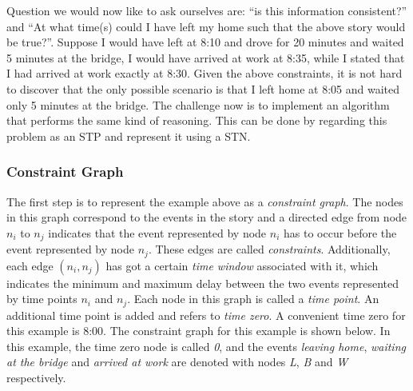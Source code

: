 \documentclass{article}
\theoremstyle{definition}
\begin{document}
Question we would now like to ask ourselves are: ``is this information consistent?'' and ``At what time(s) could I have left my home such that the above story would be true?''. 
Suppose I would have left at 8:10 and drove for 20 minutes and waited 5 minutes at the bridge, I would have arrived at work at 8:35, while I stated that I had arrived at work exactly at 8:30. 
Given the above constraints, it is not hard to discover that the only possible scenario is that I left home at 8:05 and waited only 5 minutes at the bridge.
The challenge now is to implement an algorithm that performs the same kind of reasoning. This can be done by regarding this problem as an STP and represent it using a STN.

\subsubsection{Constraint Graph}
The first step is to represent the example above as a \emph{constraint graph}. 
The nodes in this graph correspond to the events in the story and a directed edge from node $n_i$ to $n_j$ indicates that the event represented by node $n_i$ has to occur before the event represented by node $n_j$.
These edges are called \emph{constraints}. Additionally, each edge $(n_i, n_j)$ has got a certain \emph{time window} associated with it, which indicates the minimum and maximum delay between the two events represented by time points $n_i$ and $n_j$. 
Each node in this graph is called a \emph{time point}. 
An additional time point is added and refers to \emph{time zero}. 
A convenient time zero for this example is 8:00. 
The constraint graph for this example is shown below. 
In this example, the time zero node is called \emph{0}, and the events \emph{leaving home},  \emph{waiting at the bridge} and \emph{arrived at work} are denoted with nodes \emph{L}, \emph{B} and \emph{W} respectively.

\end{document}
